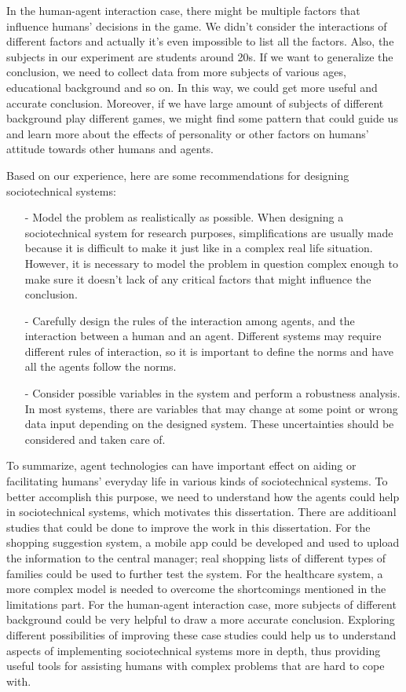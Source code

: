 In the human-agent interaction case, there might be multiple factors that influence humans' decisions in the game. We didn't consider the interactions of different factors and actually it's even impossible to list all the factors. Also, the subjects in our experiment are students around 20s. If we want to generalize the conclusion, we need to collect data from more subjects of various ages, educational background and so on. In this way, we could get more useful and accurate conclusion. Moreover, if we have large amount of subjects of different background play different games, we might find some pattern that could guide us and learn more about the effects of personality or other factors on humans' attitude towards other humans and agents.

Based on our experience, here are some recommendations for designing sociotechnical systems:
\begin{itemize}
\item[-]Model the problem as realistically as possible. When designing a sociotechnical system for research purposes, simplifications are usually made because it is difficult to make it just like in a complex real life situation. However, it is necessary to model the problem in question complex enough to make sure it doesn't lack of any critical factors that might influence the conclusion. 
\item[-]Carefully design the rules of the interaction among agents, and the interaction between a human and an agent. Different systems may require different rules of interaction, so it is important to define the norms and have all the agents follow the norms.   
\item[-]Consider possible variables in the system and perform a robustness analysis. In most systems, there are variables that may change at some point or wrong data input depending on the designed system. These uncertainties should be considered and taken care of.
\end{itemize}

To summarize, agent technologies can have important effect on aiding or facilitating humans' everyday life in various kinds of sociotechnical systems. To better accomplish this purpose, we need to understand how the agents could help in sociotechnical systems, which motivates this dissertation. There are additioanl studies that could be done to improve the work in this dissertation. For the shopping suggestion system, a mobile app could be developed and used to upload the information to the central manager; real shopping lists of different types of families could be used to further test the system. For the healthcare system, a more complex model is needed to overcome the shortcomings mentioned in the limitations part. For the human-agent interaction case, more subjects of different background could be very helpful to draw a more accurate conclusion. Exploring different possibilities of improving these case studies could help us to understand aspects of implementing sociotechnical systems more in depth, thus providing useful tools for assisting humans with complex problems that are hard to cope with.             